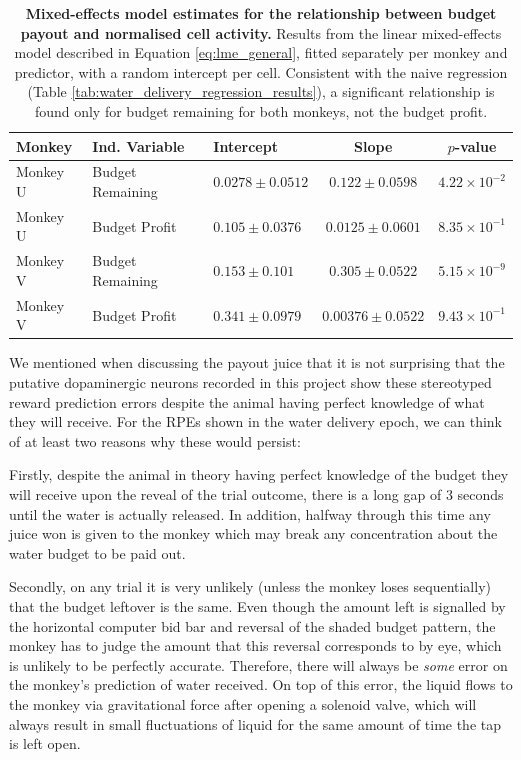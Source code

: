 \begin{table}[htbp]
\centering
\begin{tabular}{lllcc}
\hline
\textbf{Monkey} & \textbf{Ind. Variable} & \textbf{Intercept} & \textbf{Slope} & $p$\textbf{-value} \\
\hline
Monkey U & Budget Remaining & $0.0278 \pm 0.0512$ & $0.122 \pm 0.0598$ & $4.22 \times 10^{-2}$ \\
Monkey U & Budget Profit & $0.105 \pm 0.0376$ & $0.0125 \pm 0.0601$ & $8.35 \times 10^{-1}$ \\
\hline
Monkey V & Budget Remaining & $0.153 \pm 0.101$ & $0.305 \pm 0.0522$ & $5.15 \times 10^{-9}$ \\
Monkey V & Budget Profit & $0.341 \pm 0.0979$ & $0.00376 \pm 0.0522$ & $9.43 \times 10^{-1}$ \\
\hline
\end{tabular}
\caption[Mixed-effects model estimates for the relationship between budget payout and normalised cell activity.]{\textbf{Mixed-effects model estimates for the relationship between budget payout and normalised cell activity.} Results from the linear mixed-effects model described in Equation \ref{eq:lme_general}, fitted separately per monkey and predictor, with a random intercept per cell. Consistent with the naive regression (Table \ref{tab:water_delivery_regression_results}), a significant relationship is found only for budget remaining for both monkeys, not the budget profit.}
\label{tab:lme_water_delivery_regression_results}
\end{table}

We mentioned when discussing the payout juice that it is not surprising that the putative dopaminergic neurons recorded in this project show these stereotyped reward prediction errors despite the animal having perfect knowledge of what they will receive. For the RPEs shown in the water delivery epoch, we can think of at least two reasons why these would persist:

Firstly, despite the animal in theory having perfect knowledge of the budget they will receive upon the reveal of the trial outcome, there is a long gap of 3 seconds until the water is actually released. In addition, halfway through this time any juice won is given to the monkey which may break any concentration about the water budget to be paid out.

Secondly, on any trial it is very unlikely (unless the monkey loses sequentially) that the budget leftover is the same. Even though the amount left is signalled by the horizontal computer bid bar and reversal of the shaded budget pattern, the monkey has to judge the amount that this reversal corresponds to by eye, which is unlikely to be perfectly accurate. Therefore, there will always be \textit{some} error on the monkey's prediction of water received. On top of this error, the liquid flows to the monkey via gravitational force after opening a solenoid valve, which will always result in small fluctuations of liquid for the same amount of time the tap is left open.

